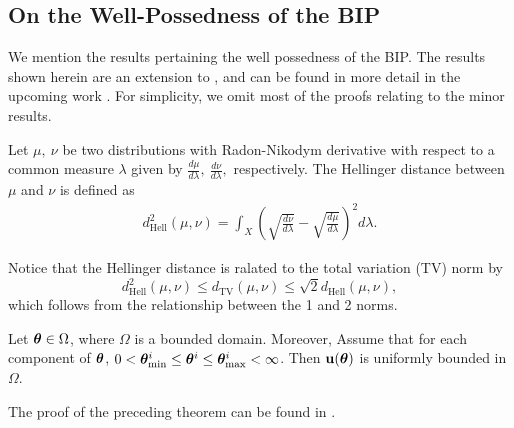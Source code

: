 \subsection{On the Well-Possedness of the BIP}
We mention the results pertaining the well possedness of the BIP.  The results shown herein are an extension to \cite{stuart2010inverse,hoang2013complexity,dodwell2015hierarchical}, and can be found in more detail in the upcoming work \cite{Madrigal2018ssi}. For simplicity, we omit most of the proofs relating to the minor results.
\begin{definition}
	Let $\mu,\ \nu$ be two distributions with Radon-Nikodym derivative with respect to a common measure $\lambda$ given by $\frac{d\mu}{d\lambda},\ \frac{d\nu}{d\lambda},$ respectively. The Hellinger distance between $\mu$ and $\nu$ is defined as \begin{align}
	d^2_\text{Hell}(\mu,\nu)=\int_X\left(\sqrt{\frac{d\nu}{d\lambda}}-\sqrt{\frac{d\mu}{d\lambda}}\right)^2d\lambda.
	\end{align}
\end{definition}	
\noindent Notice that the Hellinger distance is ralated to the total variation (TV) norm by $$d^2_\text{Hell}(\mu,\nu)\leq d_\text{TV}(\mu,\nu)\leq \sqrt{2}d_\text{Hell}(\mu,\nu),$$ which follows from the relationship between the 1 and 2 norms.
\begin{proposition}
Let $\bm{\theta}\in\Omega$, where $\Omega$ is a bounded domain. Moreover, Assume that for each component of $\bm{\theta}$, $0<\bm{\theta}^i_{\min}\leq\bm{\theta}^i\leq \bm{\theta}^i_{\max}<\infty$. Then $\mathbf{u}(\bm{\theta})$ is uniformly bounded in $\Omega$. 
\end{proposition}\noindent The proof of the preceding theorem can be found in \cite{motamed2015analysis}.\\
\\
